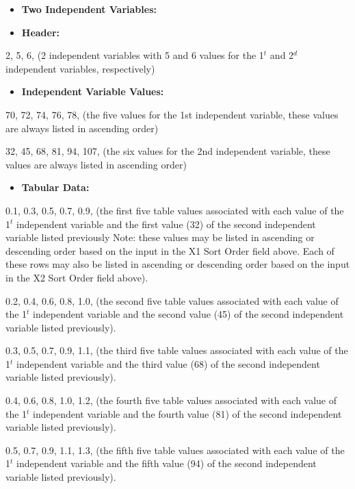 \begin{itemize}
\item
  \textbf{Two Independent Variables:}
\item
  \textbf{Header:}
\end{itemize}

2, 5, 6, (2 independent variables with 5 and 6 values for the 1\(^{t}\) and 2\(^{d}\) independent variables, respectively)

\begin{itemize}
\tightlist
\item
  \textbf{Independent Variable Values:}
\end{itemize}

70, 72, 74, 76, 78, (the five values for the 1st independent variable, these values are always listed in ascending order)

32, 45, 68, 81, 94, 107, (the six values for the 2nd independent variable, these values are always listed in ascending order)

\begin{itemize}
\tightlist
\item
  \textbf{Tabular Data:}
\end{itemize}

0.1, 0.3, 0.5, 0.7, 0.9, (the first five table values associated with each value of the 1\(^{t}\) independent variable and the first value (32) of the second independent variable listed previously Note: these values may be listed in ascending or descending order based on the input in the X1 Sort Order field above. Each of these rows may also be listed in ascending or descending order based on the input in the X2 Sort Order field above).

0.2, 0.4, 0.6, 0.8, 1.0, (the second five table values associated with each value of the 1\(^{t}\) independent variable and the second value (45) of the second independent variable listed previously).

0.3, 0.5, 0.7, 0.9, 1.1, (the third five table values associated with each value of the 1\(^{t}\) independent variable and the third value (68) of the second independent variable listed previously).

0.4, 0.6, 0.8, 1.0, 1.2, (the fourth five table values associated with each value of the 1\(^{t}\) independent variable and the fourth value (81) of the second independent variable listed previously).

0.5, 0.7, 0.9, 1.1, 1.3, (the fifth five table values associated with each value of the 1\(^{t}\) independent variable and the fifth value (94) of the second independent variable listed previously).

